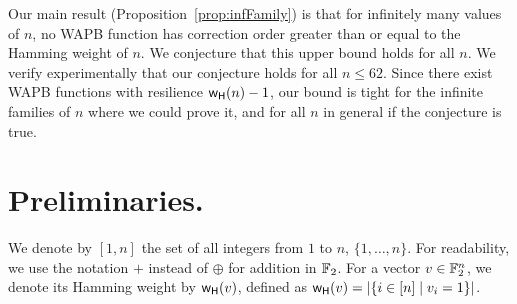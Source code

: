 \documentclass[11pt]{llncs}
\begin{document}
Our main result (Proposition~\ref{prop:infFamily}) is that for infinitely many values of $n$, no WAPB function has correction order greater than or equal to the Hamming weight of $n$.
We conjecture that this upper bound holds for all $n$.
We verify experimentally that our conjecture holds for all $n\le 62$.
Since there exist WAPB functions with resilience $\mathsf{w_H}(n)-1$, our bound is tight for the infinite families of $n$ where we could prove it, and for all $n$ in general if the conjecture is true.








\section{Preliminaries.}


We denote by $[1,n]$ the set of all integers from $1$ to $n$, \ie $\{1,\ldots,n\}$.
For readability, we use the notation $+$ instead of $\oplus$ for addition in $\mathbb{F}_2$.
For a vector $v \in \mathbb{F}_2^n$, we denote its Hamming weight by $\mathsf{w_H}(v)$, defined as $\mathsf{w_H}(v) = |\{ i \in [n] \mid v_i = 1 \}|$.
\end{document}
